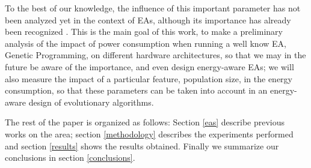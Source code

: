 To the best of our knowledge, the influence of this important
parameter has not been analyzed yet in the context of EAs, although
its importance has already been recognized \cite{self}.  This is
the main goal of this work, to make a preliminary analysis of the
impact of power consumption when running a well know EA, Genetic
Programming, on different hardware architectures, so that we may in
the future be aware of the 
importance, and even design energy-aware EAs; we will also measure the
impact of a particular feature, population size, in the energy
consumption, so that these parameters can be taken into account in an
energy-aware design of evolutionary algorithms. 

The rest of the paper is organized as follows:  Section \ref{eas}
describe previous works on the area;  section \ref{methodology}
describes the experiments performed and section \ref{results} shows
the results obtained.  Finally we summarize our conclusions in section
\ref{conclusions}. 


